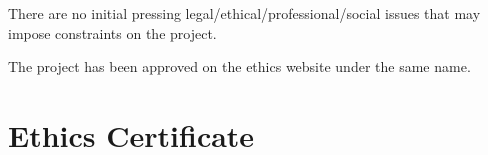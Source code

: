 There are no initial pressing legal/ethical/professional/social issues that may impose constraints on the project.

The project has been approved on the ethics website under the same name.

\chapter{Ethics Certificate}

\begin{center}
    
\end{center}
